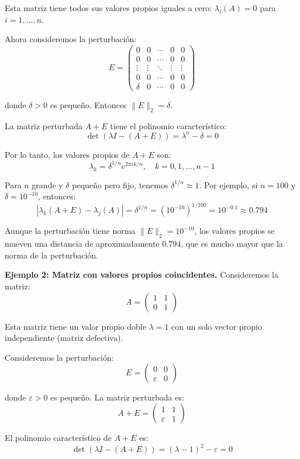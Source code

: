 \documentclass[12pt]{article}
\begin{document}
Esta matriz tiene todos sus valores propios iguales a cero: $\lambda_i(A) = 0$ para $i = 1, \ldots, n$.

Ahora consideremos la perturbación:
\[
E = \begin{pmatrix}
0 & 0 & \cdots & 0 & 0 \\
0 & 0 & \cdots & 0 & 0 \\
\vdots & \vdots & \ddots & \vdots & \vdots \\
0 & 0 & \cdots & 0 & 0 \\
\delta & 0 & \cdots & 0 & 0
\end{pmatrix}
\]

donde $\delta > 0$ es pequeño. Entonces $\|E\|_2 = \delta$.

La matriz perturbada $A + E$ tiene el polinomio característico:
\[
\det(\lambda I - (A + E)) = \lambda^n - \delta = 0
\]

Por lo tanto, los valores propios de $A + E$ son:
\[
\lambda_k = \delta^{1/n} e^{2\pi i k/n}, \quad k = 0, 1, \ldots, n-1
\]

Para $n$ grande y $\delta$ pequeño pero fijo, tenemos $\delta^{1/n} \approx 1$. Por ejemplo, si $n = 100$ y $\delta = 10^{-10}$, entonces:
\[
|\lambda_k(A + E) - \lambda_j(A)| = \delta^{1/n} = (10^{-10})^{1/100} = 10^{-0.1} \approx 0.794
\]

Aunque la perturbación tiene norma $\|E\|_2 = 10^{-10}$, los valores propios se mueven una distancia de aproximadamente $0.794$, que es mucho mayor que la norma de la perturbación.

\textbf{Ejemplo 2: Matriz con valores propios coincidentes.}
Consideremos la matriz:
\[
A = \begin{pmatrix}
1 & 1 \\
0 & 1
\end{pmatrix}
\]

Esta matriz tiene un valor propio doble $\lambda = 1$ con un solo vector propio independiente (matriz defectiva).

Consideremos la perturbación:
\[
E = \begin{pmatrix}
0 & 0 \\
\varepsilon & 0
\end{pmatrix}
\]

donde $\varepsilon > 0$ es pequeño. La matriz perturbada es:
\[
A + E = \begin{pmatrix}
1 & 1 \\
\varepsilon & 1
\end{pmatrix}
\]

El polinomio característico de $A + E$ es:
\[
\det(\lambda I - (A + E)) = (\lambda - 1)^2 - \varepsilon = 0
\]
\end{document}
